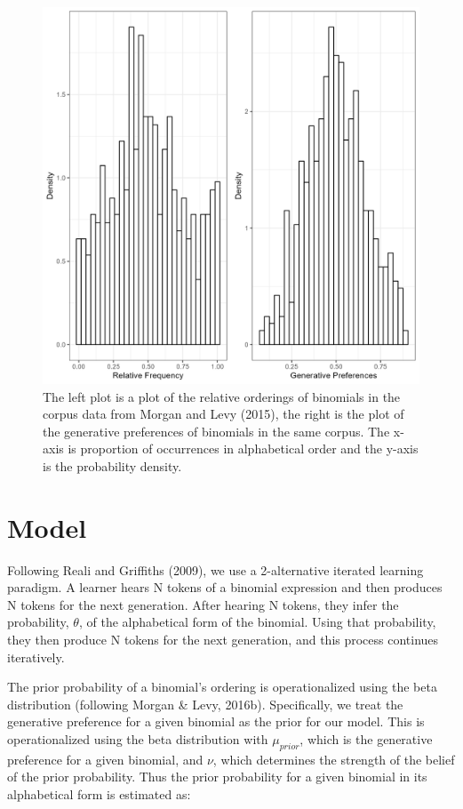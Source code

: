 \documentclass[
  jou,floatsintext]{apa6}
\begin{document}
\begin{figure}

{\centering \includegraphics[width=1\linewidth]{Figures/corpus_plots} 

}

\caption{The left plot is a plot of the relative orderings of binomials in the corpus data from Morgan and Levy (2015), the right is the plot of the generative preferences of binomials in the same corpus. The x-axis is proportion of occurrences in alphabetical order and the y-axis is the probability density.}\label{fig:corpusplot1}
\end{figure}

\section{Model}\label{model}

Following Reali and Griffiths (2009), we use a 2-alternative iterated learning paradigm. A learner hears N tokens of a binomial expression and then produces N tokens for the next generation. After hearing N tokens, they infer the probability, \(\theta\), of the alphabetical form of the binomial. Using that probability, they then produce N tokens for the next generation, and this process continues iteratively.

The prior probability of a binomial's ordering is operationalized using the beta distribution (following Morgan \& Levy, 2016b). Specifically, we treat the generative preference for a given binomial as the prior for our model. This is operationalized using the beta distribution with \(\mu_{prior}\), which is the generative preference for a given binomial, and \(\nu\), which determines the strength of the belief of the prior probability. Thus the prior probability for a given binomial in its alphabetical form is estimated as:
\end{document}
